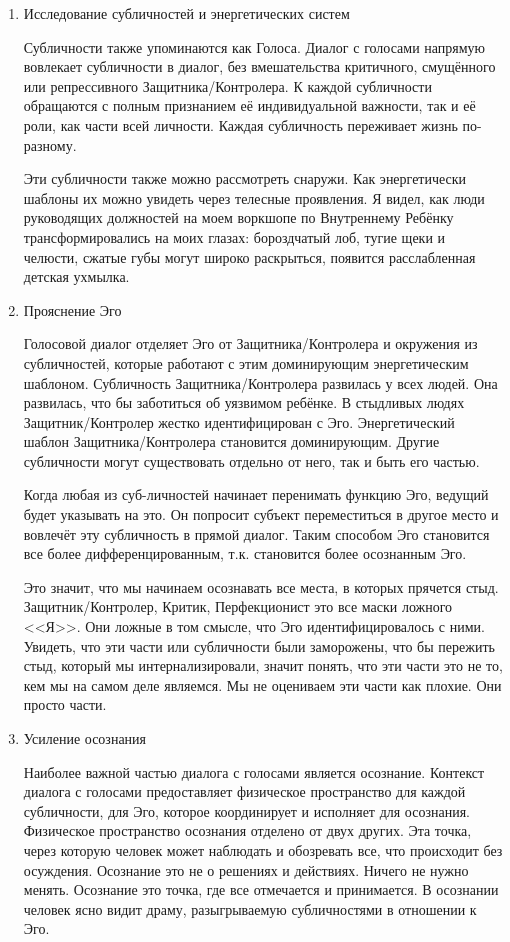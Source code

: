 \documentclass[10pt, fleqn]{article}
\begin{document}
\begin{enumerate}
\item Исследование субличностей и энергетических систем

Субличности также упоминаются как Голоса. Диалог с голосами напрямую вовлекает субличности в диалог, без вмешательства критичного, смущённого или репрессивного Защитника/Контролера. К каждой субличности обращаются с полным признанием её индивидуальной важности, так и её роли, как части всей личности. Каждая субличность переживает жизнь по-разному.

Эти субличности также можно рассмотреть снаружи. Как энергетически шаблоны их можно увидеть через телесные проявления. Я видел, как люди руководящих должностей на моем воркшопе по Внутреннему Ребёнку трансформировались на моих глазах: бороздчатый лоб, тугие щеки и челюсти, сжатые губы могут широко раскрыться, появится расслабленная детская ухмылка.

\item Прояснение Эго

Голосовой диалог отделяет Эго от Защитника/Контролера и окружения из субличностей, которые работают с этим доминирующим энергетическим шаблоном. Субличность Защитника/Контролера развилась у всех людей. Она развилась, что бы заботиться об уязвимом ребёнке. В стыдливых людях Защитник/Контролер жестко идентифицирован с Эго. Энергетический шаблон Защитника/Контролера становится доминирующим. Другие субличности могут существовать отдельно от него, так и быть его частью.

Когда любая из суб-личностей начинает перенимать функцию Эго, ведущий будет указывать на это. Он попросит субъект переместиться в другое место и вовлечёт эту субличность в прямой диалог. Таким способом Эго становится все более дифференцированным, т.к. становится более осознанным Эго.

Это значит, что мы начинаем осознавать все места, в которых прячется стыд. Защитник/Контролер, Критик, Перфекционист это все маски ложного <<Я>>. Они ложные в том смысле, что Эго идентифицировалось с ними. Увидеть, что эти части или субличности были заморожены, что бы пережить стыд, который мы интернализировали, значит понять, что эти части это не то, кем мы на самом деле являемся. Мы не оцениваем эти части как плохие. Они просто части.

\item Усиление осознания

Наиболее важной частью диалога с голосами является осознание. Контекст диалога с голосами предоставляет физическое пространство для каждой субличности, для Эго, которое координирует и исполняет для осознания. Физическое пространство осознания отделено от двух других. Эта точка, через которую человек может наблюдать и обозревать все, что происходит без осуждения. Осознание это не о решениях и действиях. Ничего не нужно менять. Осознание это точка, где все отмечается и принимается. В осознании человек ясно видит драму, разыгрываемую субличностями в отношении к Эго.


\end{enumerate}
\end{document}

